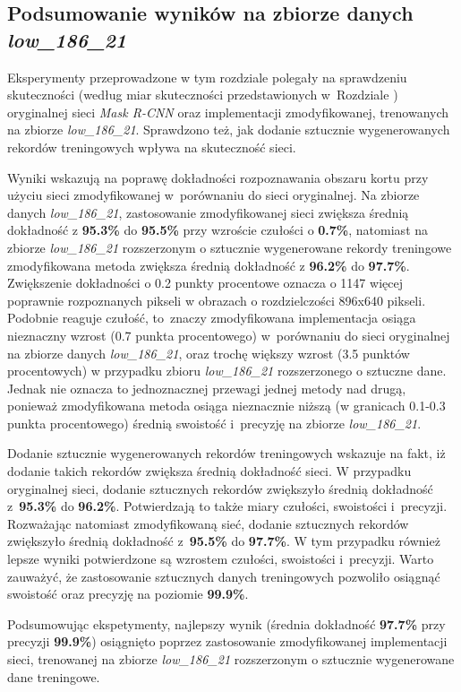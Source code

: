 \subsection{Podsumowanie wyników na zbiorze danych \textit{low\_186\_21}}
Eksperymenty przeprowadzone w tym rozdziale polegały na sprawdzeniu skuteczności (według miar skuteczności przedstawionych w~Rozdziale ) oryginalnej sieci \textit{Mask R-CNN} oraz implementacji zmodyfikowanej, trenowanych na zbiorze \textit{low\_186\_21}.
Sprawdzono też, jak dodanie sztucznie wygenerowanych rekordów treningowych wpływa na skuteczność sieci.


Wyniki wskazują na poprawę dokładności rozpoznawania obszaru kortu przy użyciu sieci zmodyfikowanej w~porównaniu do sieci oryginalnej.
Na zbiorze danych \textit{low\_186\_21}, zastosowanie zmodyfikowanej sieci zwiększa średnią dokładność z \textbf{95.3\%} do \textbf{95.5\%} przy wzroście czułości o \textbf{0.7\%}, natomiast na zbiorze \textit{low\_186\_21} rozszerzonym o sztucznie wygenerowane rekordy treningowe zmodyfikowana metoda zwiększa średnią dokładność z \textbf{96.2\%} do \textbf{97.7\%}. Zwiększenie dokładności o 0.2 punkty procentowe oznacza o 1147 więcej poprawnie rozpoznanych pikseli w obrazach o rozdzielczości 896x640 pikseli.
Podobnie reaguje czułość, to~znaczy zmodyfikowana implementacja osiąga nieznaczny wzrost (0.7 punkta procentowego) w~porównaniu do sieci oryginalnej na zbiorze danych \textit{low\_186\_21}, oraz trochę większy wzrost (3.5 punktów procentowych) w przypadku zbioru \textit{low\_186\_21} rozszerzonego o sztuczne dane. Jednak nie oznacza to jednoznacznej przewagi jednej metody nad drugą, ponieważ zmodyfikowana metoda osiąga nieznacznie niższą (w granicach 0.1-0.3 punkta procentowego) średnią swoistość i~precyzję na zbiorze \textit{low\_186\_21}.


Dodanie sztucznie wygenerowanych rekordów treningowych wskazuje na fakt, iż dodanie takich rekordów zwiększa średnią dokładność sieci. W przypadku oryginalnej sieci, dodanie sztucznych rekordów zwiększyło średnią dokładność z~\textbf{95.3\%} do \textbf{96.2\%}. Potwierdzają to także miary czułości, swoistości i~precyzji. Rozważając natomiast zmodyfikowaną sieć, dodanie sztucznych rekordów zwiększyło średnią dokładność z~\textbf{95.5\%} do \textbf{97.7\%}. W tym przypadku również lepsze wyniki potwierdzone są wzrostem czułości, swoistości i~precyzji. Warto zauważyć, że zastosowanie sztucznych danych treningowych pozwoliło osiągnąć swoistość oraz precyzję na poziomie \textbf{99.9\%}.


Podsumowując ekspetymenty, najlepszy wynik (średnia dokładność \textbf{97.7\%} przy precyzji \textbf{99.9\%}) osiągnięto poprzez zastosowanie zmodyfikowanej implementacji sieci, trenowanej na zbiorze \textit{low\_186\_21} rozszerzonym o sztucznie wygenerowane dane treningowe.
